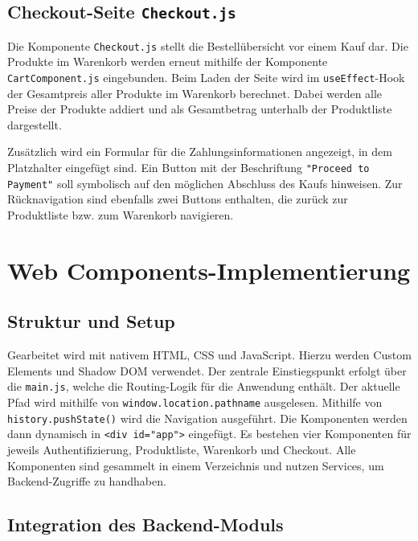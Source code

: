 \documentclass[oneside]{ausarbeitung}
\begin{document}
\subsection{Checkout-Seite \texttt{Checkout.js}}

Die Komponente \texttt{Checkout.js} stellt die Bestellübersicht vor einem Kauf dar.
Die Produkte im Warenkorb werden erneut mithilfe der Komponente \texttt{CartComponent.js} eingebunden. Beim Laden der Seite wird im \texttt{useEffect}-Hook der Gesamtpreis aller Produkte im Warenkorb berechnet. Dabei werden alle Preise der Produkte addiert und als Gesamtbetrag unterhalb der Produktliste dargestellt.

Zusätzlich wird ein Formular für die Zahlungsinformationen angezeigt, in dem Platzhalter eingefügt sind. Ein Button mit der Beschriftung \texttt{"Proceed to Payment"} soll symbolisch auf den möglichen Abschluss des Kaufs hinweisen.
Zur Rücknavigation sind ebenfalls zwei Buttons enthalten, die zurück zur Produktliste bzw. zum Warenkorb navigieren.

\section{Web Components-Implementierung}

\subsection{Struktur und Setup}

Gearbeitet wird mit nativem HTML, CSS und JavaScript. Hierzu werden Custom Elements und Shadow DOM verwendet. Der zentrale Einstiegspunkt erfolgt über die \texttt{main.js}, welche die Routing-Logik für die Anwendung enthält. Der aktuelle Pfad wird mithilfe von \texttt{window.location.pathname} ausgelesen. Mithilfe von \texttt{history.pushState()} wird die Navigation ausgeführt. Die Komponenten werden dann dynamisch in \texttt{<div id="app">} eingefügt. Es bestehen vier Komponenten für jeweils Authentifizierung, Produktliste, Warenkorb und Checkout. Alle Komponenten sind gesammelt in einem Verzeichnis und nutzen Services, um Backend-Zugriffe zu handhaben.

\subsection{Integration des Backend-Moduls}
\end{document}
